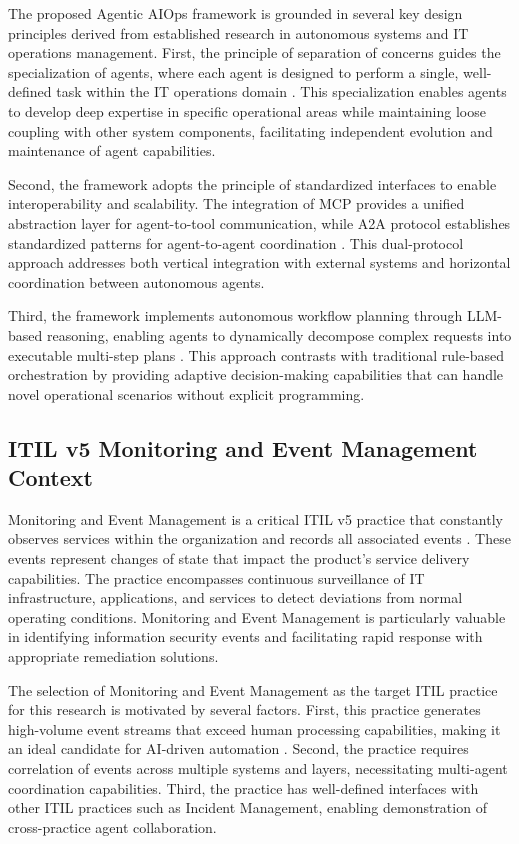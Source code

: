 \documentclass{article}
\begin{document}
The proposed Agentic AIOps framework is grounded in several key design principles derived from established research in autonomous systems and IT operations management. First, the principle of separation of concerns guides the specialization of agents, where each agent is designed to perform a single, well-defined task within the IT operations domain \cite{dijkstra1982}. This specialization enables agents to develop deep expertise in specific operational areas while maintaining loose coupling with other system components, facilitating independent evolution and maintenance of agent capabilities.

Second, the framework adopts the principle of standardized interfaces to enable interoperability and scalability. The integration of MCP provides a unified abstraction layer for agent-to-tool communication, while A2A protocol establishes standardized patterns for agent-to-agent coordination \cite{anthropic2024,openai2024}. This dual-protocol approach addresses both vertical integration with external systems and horizontal coordination between autonomous agents.

Third, the framework implements autonomous workflow planning through LLM-based reasoning, enabling agents to dynamically decompose complex requests into executable multi-step plans \cite{langchain2024}. This approach contrasts with traditional rule-based orchestration by providing adaptive decision-making capabilities that can handle novel operational scenarios without explicit programming.

\subsection{ITIL v5 Monitoring and Event Management Context}

Monitoring and Event Management is a critical ITIL v5 practice that constantly observes services within the organization and records all associated events \cite{axelos2019}. These events represent changes of state that impact the product's service delivery capabilities. The practice encompasses continuous surveillance of IT infrastructure, applications, and services to detect deviations from normal operating conditions. Monitoring and Event Management is particularly valuable in identifying information security events and facilitating rapid response with appropriate remediation solutions.

The selection of Monitoring and Event Management as the target ITIL practice for this research is motivated by several factors. First, this practice generates high-volume event streams that exceed human processing capabilities, making it an ideal candidate for AI-driven automation \cite{li2023}. Second, the practice requires correlation of events across multiple systems and layers, necessitating multi-agent coordination capabilities. Third, the practice has well-defined interfaces with other ITIL practices such as Incident Management, enabling demonstration of cross-practice agent collaboration.
\end{document}
